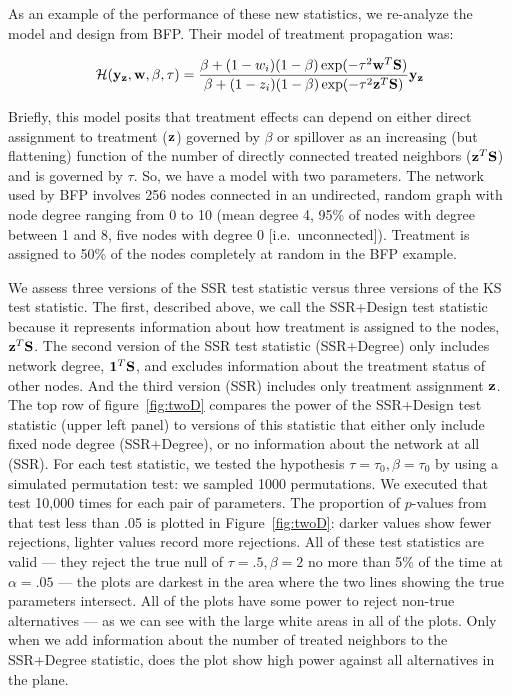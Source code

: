 As an example of the performance of these new statistics, we re-analyze the
model and design from BFP. Their model of treatment propagation
was:

\begin{equation}
\mathcal{H}(\mathbf{y}_{\mathbf{z}}, \mathbf{w}, \beta, \tau) =
 \frac{\beta + (1 - w_i) (1 - \beta) \exp(- \tau^2 \mathbf{w}^{T} \mathbf{S})}
      {\beta + (1 - z_i) (1 - \beta) \exp(- \tau^2 \mathbf{z}^{T} \mathbf{S})} \mathbf{y}_{\mathbf{z}}
\label{eq:spillovermodelA}
\end{equation}

Briefly, this model posits that treatment effects can depend on either direct
assignment to treatment ($\mathbf{z}$) governed by $\beta$ or spillover as an
increasing (but flattening) function of the number of directly connected
treated neighbors ($\mathbf{z}^{T} \mathbf{S}$) and is governed by $\tau$. So, we have a
model with two parameters. The network used by BFP involves 256 nodes
connected in an undirected, random graph with node degree ranging from 0 to 10
(mean degree 4, 95\% of nodes with degree between 1 and 8, five nodes with
degree 0 [i.e.\ unconnected]).  Treatment is assigned to 50\% of the nodes 
completely at random in the BFP example.

We assess three versions of the SSR test statistic versus three versions of
the KS test statistic. The first, described above, we call the SSR+Design test
statistic because it represents information about how treatment is assigned to
the nodes, $\mathbf{z}^T \mathbf{S}$. The second version of
the SSR test statistic (SSR+Degree) only includes network degree,  $\mathbf{1}^T \mathbf{S}$, and
excludes information about the treatment status of other nodes. And the
third version (SSR) includes only treatment assignment $\mathbf{z}$. The top row of
figure~\ref{fig:twoD} compares the power of the SSR+Design test statistic
(upper left panel) to versions of this statistic that either only include
fixed node degree (SSR+Degree), or no information about the network at all
(SSR). For each test statistic, we tested the hypothesis
$\tau=\tau_0,\beta=\tau_0$ by using a simulated permutation test: we
sampled 1000 permutations. We executed that test
10,000 times for each pair of parameters.  The proportion of $p$-values from
that test less than .05 is plotted in Figure~\ref{fig:twoD}: darker values
show fewer rejections, lighter values record more rejections.  All of these
test statistics are valid --- they reject the true null of $\tau=.5,\beta=2$
no more than 5\% of the time at $\alpha=.05$ --- the plots are darkest in the
area where the two lines showing the true parameters intersect. All of the
plots have some power to reject non-true alternatives --- as we can see with
the large white areas in all of the plots. Only when we add
information about the number of treated neighbors to the SSR+Degree statistic,
does the plot show high power against all alternatives in the plane.


